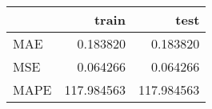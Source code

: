 \begin{tabular}{lrr}
\toprule
{} &       train &        test \\
\midrule
MAE  &    0.183820 &    0.183820 \\
MSE  &    0.064266 &    0.064266 \\
MAPE &  117.984563 &  117.984563 \\
\bottomrule
\end{tabular}
